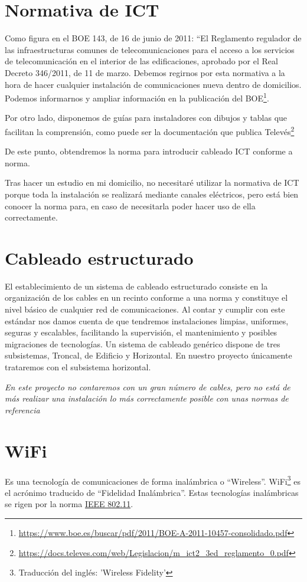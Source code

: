 \section{Normativa de ICT}
Como figura en el BOE 143, de 16 de junio de 2011: “El Reglamento regulador de las infraestructuras comunes de telecomunicaciones para el acceso a los servicios de telecomunicación en el interior de las edificaciones, aprobado por el Real Decreto 346/2011, de 11 de marzo.
Debemos regirnos por esta normativa a la hora de hacer cualquier instalación de comunicaciones nueva dentro de domicilios.
Podemos informarnos y ampliar información en la publicación del BOE\footnote{\url{https://www.boe.es/buscar/pdf/2011/BOE-A-2011-10457-consolidado.pdf}}.

Por otro lado, disponemos de guías para instaladores con dibujos y tablas que facilitan la comprensión, como puede ser la documentación que publica Televés\footnote{\url{https://docs.televes.com/web/Legislacion/m_ict2_3ed_reglamento_0.pdf}}

De este punto, obtendremos la norma para introducir cableado ICT conforme a norma.

Tras hacer un estudio en mi domicilio, no necesitaré utilizar la normativa de ICT porque toda la instalación se realizará mediante canales eléctricos, pero está bien conocer la norma para, en caso de necesitarla poder hacer uso de ella correctamente.

\section{Cableado estructurado}
El establecimiento de un sistema de cableado estructurado consiste en la organización de los cables en un recinto conforme a una norma y constituye el nivel básico de cualquier red de comunicaciones.
Al contar y cumplir con este estándar nos damos cuenta de que tendremos instalaciones limpias, uniformes, seguras y escalables, facilitando la supervisión, el mantenimiento y posibles migraciones de tecnologías.
Un sistema de cableado genérico dispone de tres subsistemas, Troncal, de Edificio y Horizontal. En nuestro proyecto únicamente trataremos con el subsistema horizontal.

\emph{En este proyecto no contaremos con un gran número de cables, pero no está de más realizar una instalación lo más correctamente posible con unas normas de referencia}

\section{WiFi}
Es una tecnología de comunicaciones de forma inalámbrica o “Wireless”. WiFi\footnote{Traducción del inglés: 'Wireless Fidelity'} es el acrónimo traducido de “Fidelidad Inalámbrica”.
Estas tecnologías inalámbricas se rigen por la norma \underline{IEEE 802.11}.

